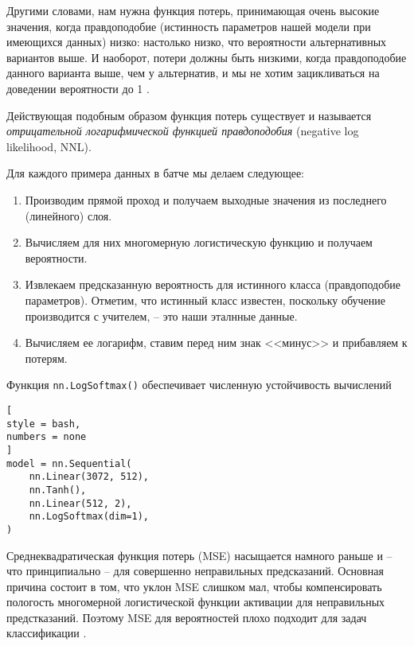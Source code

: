 \documentclass[%
	11pt,
	a4paper,
	utf8,
		]{article}
\begin{document}
Другими словами, нам нужна функция потерь, принимающая очень высокие значения, когда правдоподобие (истинность параметров нашей модели при имеющихся данных) низко: настолько низко, что вероятности альтернативных вариантов выше. И наоборот, потери должны быть низкими, когда правдоподобие данного варианта выше, чем у альтернатив, и мы не хотим зацикливаться на доведении вероятности до 1 \cite[]{pytorch-2022}.

Действующая подобным образом функция потерь существует и называется \emph{отрицательной логарифмической функцией правдоподобия} (negative log likelihood, NNL). 

Для каждого примера данных в батче мы делаем следующее:
\begin{enumerate}
	\item Производим прямой проход и получаем выходные значения из последнего (линейного) слоя.
	
	\item Вычисляем для них многомерную логистическую функцию и получаем вероятности.
	
	\item Извлекаем предсказанную вероятность для истинного класса (правдоподобие параметров). Отметим, что истинный класс известен, поскольку обучение производится с учителем, -- это наши эталнные данные.
	
	\item Вычисляем ее логарифм, ставим перед ним знак <<минус>> и прибавляем к потерям.
\end{enumerate}

Функция \verb|nn.LogSoftmax()| обеспечивает численную устойчивость вычислений
\begin{lstlisting}[
style = bash,
numbers = none
]
model = nn.Sequential(
    nn.Linear(3072, 512),
    nn.Tanh(),
    nn.Linear(512, 2),
    nn.LogSoftmax(dim=1),
)
\end{lstlisting}

Среднеквадратическая функция потерь (MSE) насыщается намного раньше и -- что принципиально -- для совершенно неправильных предсказаний. Основная причина состоит в том, что уклон MSE слишком мал, чтобы компенсировать пологость многомерной логистической функции активации для неправильных предстказаний. {\color{red}Поэтому MSE для вероятностей плохо подходит для задач классификации} \cite[]{pytorch-2022}.
\end{document}
